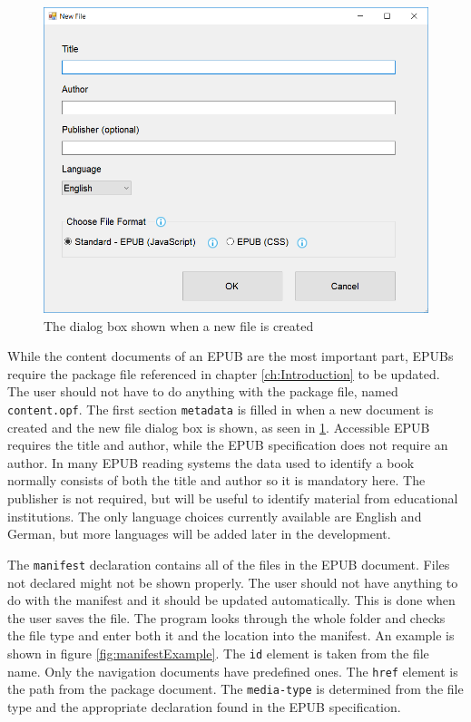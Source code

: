 \begin{figure}[h]
	\centering
	\includegraphics[width=\linewidth*4/5]{figures/newFileDialogBox.png}
	\caption{The dialog box shown when a new file is created}
	\label{fig:newFileDialogBox}
\end{figure}

While the content documents of an EPUB are the most important part, EPUBs require the package file referenced in chapter \ref{ch:Introduction} to be updated. The user should not have to do anything with the package file, named \lstinline|content.opf|. The first section \lstinline|metadata| is filled in when a new document is created and the new file dialog box is shown, as seen in \ref{fig:newFileDialogBox}. Accessible EPUB requires the title and author, while the EPUB specification does not require an author. In many EPUB reading systems the data used to identify a book normally consists of both the title and author so it is mandatory here. The publisher is not required, but will be useful to identify material from educational institutions. The only language choices currently available are English and German, but more languages will be added later in the development. 

The \lstinline|manifest| declaration contains all of the files in the EPUB document. Files not declared might not be shown properly. The user should not have anything to do with the manifest and it should be updated automatically. This is done when the user saves the file. The program looks through the whole folder and checks the file type and enter both it and the location into the manifest. An example is shown in figure \ref{fig:manifestExample}. The \lstinline|id| element is taken from the file name. Only the navigation documents have predefined ones. The \lstinline|href| element is the path from the package document. The \lstinline|media-type| is determined from the file type and the appropriate declaration found in the EPUB specification.

